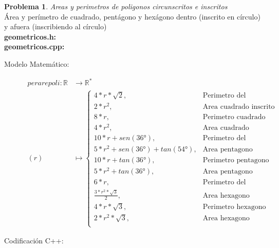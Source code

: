 \documentclass{article}
\theoremstyle{plain}
\theoremstyle{definition}
\newtheorem{problem}{Problema}
\begin{document}
\begin{problem} \emph{Areas y perimetros de poligonos circunscritos e inscritos}\\
Área y perímetro de cuadrado, pentágono y hexágono dentro (inscrito en círculo) y afuera (inscribiendo al círculo)\\
\textbf{geometricos.h:}\ \\
\textbf{geometricos.cpp:}\ 
%
\begin{description}
\item[Modelo Matemático:]
%
\begin{align*}
per are poli: \mathbb{R} &\to \mathbb{R}^*\\
(r) &\mapsto
\begin{cases}
4*r*\sqrt{2},& \text{Perimetro del cuadrado inscrito}\\
2*r^2,& \text{Area cuadrado inscrito}\\
8*r,& \text{Perimetro cuadrado circunscrito}\\
4*r^2,& \text{Area cuadrado circunscrito}\\
10*r + sen(36°),& \text{Perimetro del pentagono inscrito}\\
5*r^2 + sen(36°) + tan(54°),& \text{Area pentagono inscrito}\\
10*r + tan(36°),& \text{Perimetro pentagono circunscrito}\\
5*r^2 + tan(36°),& \text{Area pentagono circunscrito}\\
6*r,& \text{Perimetro del hexagono inscrito}\\
\frac{3*r^2*\sqrt{3}}{2},& \text{Area hexagono inscrito}\\
4*r*\sqrt{3},& \text{Perimetro hexagono circunscrito}\\
2*r^2*\sqrt{3},& \text{Area hexagono circunscrito}\\
\end{cases}
\end{align*}
%
\item[Codificación \textsf{C++}:]\hfill
%
\begin{verbatim}

\end{verbatim}
\end{description}
\end{problem}
\end{document}
